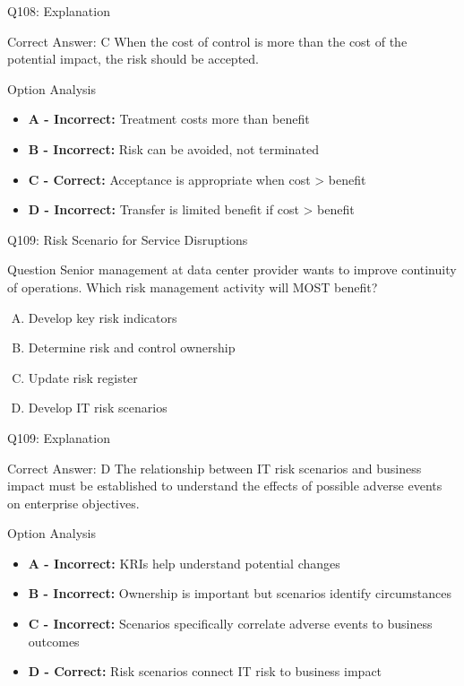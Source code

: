 \documentclass{beamer}
\begin{document}
	\begin{frame}{Q108: Explanation}
		\begin{block}{Correct Answer: C}
			When the cost of control is more than the cost of the potential impact, the risk should be accepted.
		\end{block}
		\begin{block}{Option Analysis}
			\begin{itemize}
				\item \textbf{A - Incorrect:} Treatment costs more than benefit
				\item \textbf{B - Incorrect:} Risk can be avoided, not terminated
				\item \textbf{C - Correct:} Acceptance is appropriate when cost > benefit
				\item \textbf{D - Incorrect:} Transfer is limited benefit if cost > benefit
			\end{itemize}
		\end{block}
	\end{frame}
	
	\begin{frame}{Q109: Risk Scenario for Service Disruptions}
		\begin{block}{Question}
			Senior management at data center provider wants to improve continuity of operations. Which risk management activity will MOST benefit?
		\end{block}
		\begin{enumerate}[(A)]
			\item Develop key risk indicators
			\item Determine risk and control ownership
			\item Update risk register
			\item Develop IT risk scenarios
		\end{enumerate}
	\end{frame}
	
	\begin{frame}{Q109: Explanation}
		\begin{block}{Correct Answer: D}
			The relationship between IT risk scenarios and business impact must be established to understand the effects of possible adverse events on enterprise objectives.
		\end{block}
		\begin{block}{Option Analysis}
			\begin{itemize}
				\item \textbf{A - Incorrect:} KRIs help understand potential changes
				\item \textbf{B - Incorrect:} Ownership is important but scenarios identify circumstances
				\item \textbf{C - Incorrect:} Scenarios specifically correlate adverse events to business outcomes
				\item \textbf{D - Correct:} Risk scenarios connect IT risk to business impact
			\end{itemize}
		\end{block}
	\end{frame}
	
\end{document}
